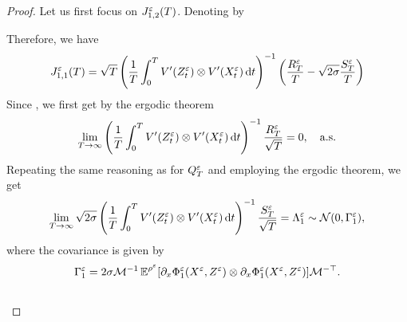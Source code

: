 \documentclass[10pt]{article}
\begin{document}
\begin{proof}
	Let us first focus on $J_{1,2}^\varepsilon(T)$. Denoting by 
		
	
	Therefore, we have
	\begin{equation}
		J_{1,1}^\varepsilon(T)= \sqrt{T} \left(\frac1T \int_0^T V'(Z^\varepsilon_t) \otimes V'(X^\varepsilon_t) \,\mathrm{d} t\right)^{-1} \left( \frac{R_T^\varepsilon}{T} - \sqrt{2\sigma}\frac{S^\varepsilon_T}{T} \right)
	\end{equation}
	Since , we first get by the ergodic theorem
	\begin{equation}
		\lim_{T \to \infty} \left(\frac1T \int_0^T V'(Z^\varepsilon_t) \otimes V'(X^\varepsilon_t) \,\mathrm{d} t\right)^{-1} \frac{R_T^\varepsilon}{\sqrt{T}} = 0, \quad \text{a.s.}
	\end{equation}
	Repeating the same reasoning as for $Q_T^\varepsilon$ and employing the ergodic theorem, we get 
	\begin{equation}
	\lim_{T \to \infty} \sqrt{2\sigma} \left(\frac1T \int_0^T V'(Z^\varepsilon_t) \otimes V'(X^\varepsilon_t) \,\mathrm{d} t\right)^{-1} \frac{S_T^\varepsilon}{\sqrt{T}} = \Lambda_1^\varepsilon \sim \mathcal N(0, \Gamma_1^\varepsilon),
	\end{equation}
	where the covariance is given by
	\begin{equation}
		\Gamma_1^\varepsilon = 2\sigma \mathcal M^{-1}\operatorname{\mathbb{E}}^{\rho^\varepsilon}[\partial_x \Phi_1^\varepsilon(X^\varepsilon, Z^\varepsilon) \otimes \partial_x \Phi_1^\varepsilon(X^\varepsilon, Z^\varepsilon)]\mathcal M^{-\top}.
	\end{equation}
	 \\
	

\end{proof}
\end{document}
